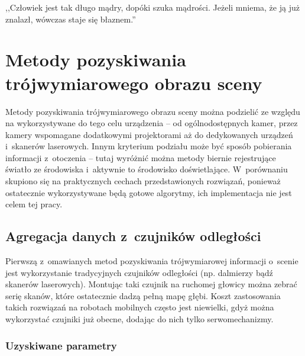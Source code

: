 

\begin{savequote}[70mm]
,,Człowiek jest tak długo mądry, dopóki szuka mądrości. Jeżeli mniema, że ją już
znalazł, wówczas staje się błaznem.''
\end{savequote}

\chapter{Metody pozyskiwania trójwymiarowego obrazu sceny}
\label{chap:porownanie}


Metody pozyskiwania trójwymiarowego obrazu sceny można podzielić ze względu
na wykorzystywane do tego celu urządzenia -- od ogólnodostępnych kamer, przez
kamery wspomagane dodatkowymi projektorami aż do dedykowanych urządzeń 
i~skanerów laserowych. Innym kryterium podziału może być sposób pobierania
informacji z~otoczenia -- tutaj wyróżnić można metody biernie rejestrujące
światło ze środowiska i~aktywnie to środowisko doświetlające. W~porównaniu
skupiono się na praktycznych cechach przedstawionych rozwiązań, ponieważ
ostatecznie wykorzystywane będą gotowe algorytmy, ich implementacja nie jest
celem tej pracy.

\section{Agregacja danych z~czujników odległości}

Pierwszą z~omawianych metod pozyskiwania trójwymiarowej informacji o~scenie jest
wykorzystanie tradycyjnych czujników odległości (np. dalmierzy bądź skanerów
laserowych). Montując taki czujnik na ruchomej głowicy można zebrać serię
skanów, które ostatecznie dadzą pełną mapę głębi. Koszt zastosowania takich
rozwiązań na robotach mobilnych często jest niewielki, gdyż można wykorzystać
czujniki już obecne, dodając do nich tylko serwomechanizmy.

\subsection{Uzyskiwane parametry}

